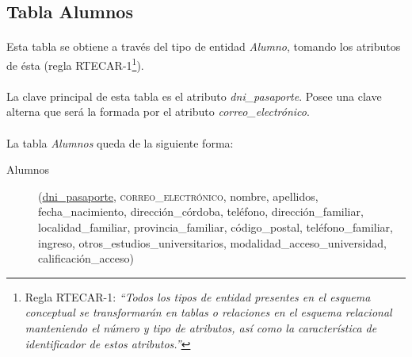    \subsection{Tabla Alumnos}

      \paragraph{}Esta tabla se obtiene a través del tipo de entidad
      \textit{Alumno}, tomando los atributos de ésta (regla
      RTECAR-1\footnote{Regla RTECAR-1: \textit{``Todos los tipos de entidad
      presentes en el esquema conceptual se transformarán en tablas o relaciones
      en el esquema relacional manteniendo el número y tipo de atributos, así
      como la característica de identificador de estos atributos.''}}).

      \paragraph{}La clave principal de esta tabla es el atributo
      \textit{dni\_pasaporte}. Posee una clave alterna que será la formada por
      el atributo \textit{correo\_electrónico}.

      \paragraph{}La tabla \textit{Alumnos} queda de la siguiente forma:

      \begin{description}
         \item[Alumnos] \begin{flushleft}(\underline{dni\_pasaporte},
         \textsc{correo\_electrónico}, nombre, apellidos, fecha\_nacimiento,
         dirección\_córdoba, teléfono, dirección\_familiar, localidad\_familiar,
         provincia\_familiar, código\_postal, teléfono\_familiar, ingreso,
         otros\_estudios\_universitarios, modalidad\_acceso\_universidad,
         calificación\_acceso)\end{flushleft}
      \end{description}
